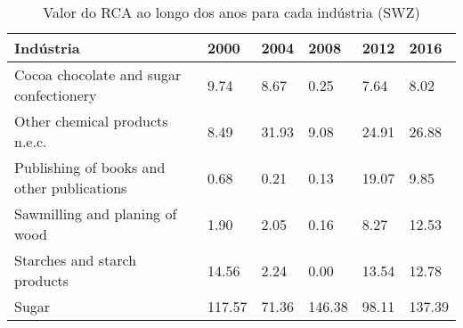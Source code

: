 \begin{table}
\centering
\caption{Valor do RCA ao longo dos anos para cada indústria (SWZ)}
\begin{tabular}{p{6cm}p{1.5cm}p{1.5cm}p{1.5cm}p{1.5cm}p{1.5cm}}
\toprule
                                 Indústria &   2000 &  2004 &   2008 &  2012 &   2016 \\
\midrule
   Cocoa chocolate and sugar confectionery &   9.74 &  8.67 &   0.25 &  7.64 &   8.02 \\
            Other chemical products n.e.c. &   8.49 & 31.93 &   9.08 & 24.91 &  26.88 \\
Publishing of books and other publications &   0.68 &  0.21 &   0.13 & 19.07 &   9.85 \\
            Sawmilling and planing of wood &   1.90 &  2.05 &   0.16 &  8.27 &  12.53 \\
              Starches and starch products &  14.56 &  2.24 &   0.00 & 13.54 &  12.78 \\
                                     Sugar & 117.57 & 71.36 & 146.38 & 98.11 & 137.39 \\
\bottomrule
\end{tabular}
\end{table}
